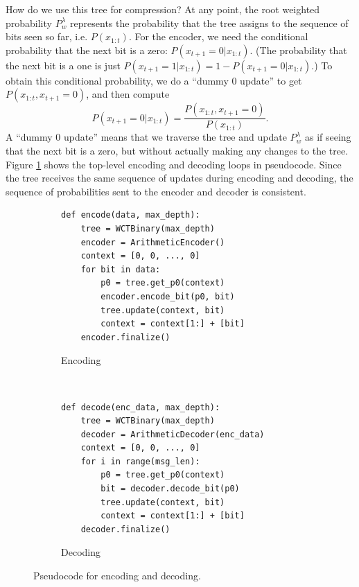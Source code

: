 \documentclass[11pt]{scrartcl}
\begin{document}
How do we use this tree for compression? At any point, the root weighted
probability $P_w^\lambda$ represents the probability that the tree assigns to
the sequence of bits seen so far, i.e. $P(x_{1:t})$. For the encoder, we need
the conditional probability that the next bit is a zero:
$P(x_{t+1} = 0 | x_{1:t})$. (The probability that the next bit is a one is just
$P(x_{t+1} = 1 | x_{1:t}) = 1 - P(x_{t+1} = 0 | x_{1:t})$.)
To obtain this conditional probability, we do a
``dummy 0 update'' to get $P(x_{1:t}, x_{t+1} = 0)$, and then compute
\[
P(x_{t+1} = 0 | x_{1:t}) = \frac{ P(x_{1:t}, x_{t+1} = 0) }{ P(x_{1:t}) }.
\]
A ``dummy 0 update'' means that we traverse the tree and update $P_w^\lambda$
as if seeing that the next bit is a zero, but without actually making any
changes to the tree. Figure \ref{fig:enc-dec} shows the top-level encoding and
decoding loops in pseudocode. Since the tree receives the same sequence of
updates during encoding and decoding, the sequence of probabilities sent to the
encoder and decoder is consistent.

\begin{figure}[h!]
    \centering
    \begin{subfigure}[b]{0.5\textwidth}
\begin{verbatim}
def encode(data, max_depth):
    tree = WCTBinary(max_depth)
    encoder = ArithmeticEncoder()
    context = [0, 0, ..., 0]
    for bit in data:
        p0 = tree.get_p0(context)
        encoder.encode_bit(p0, bit)
        tree.update(context, bit)
        context = context[1:] + [bit]
    encoder.finalize() \end{verbatim}
        \caption{Encoding}
    \end{subfigure}
    ~
    \begin{subfigure}[b]{0.45\textwidth}
\begin{verbatim}
def decode(enc_data, max_depth):
    tree = WCTBinary(max_depth)
    decoder = ArithmeticDecoder(enc_data)
    context = [0, 0, ..., 0]
    for i in range(msg_len):
        p0 = tree.get_p0(context)
        bit = decoder.decode_bit(p0)
        tree.update(context, bit)
        context = context[1:] + [bit]
    decoder.finalize() \end{verbatim}
        \caption{Decoding}
    \end{subfigure}
    \caption{Pseudocode for encoding and decoding.}
    \label{fig:enc-dec}
\end{figure}

\end{document}

